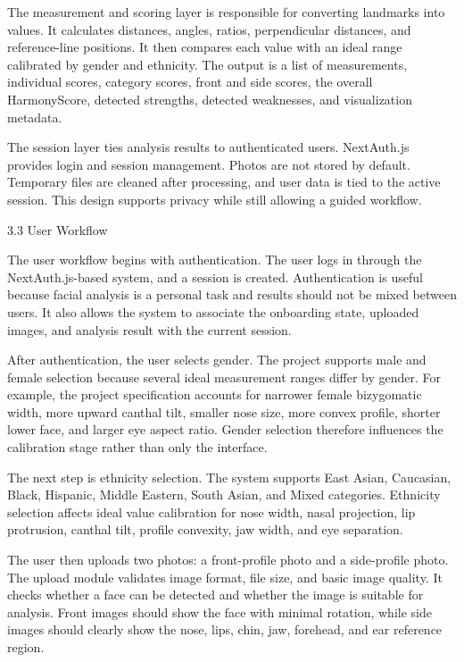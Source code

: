The measurement and scoring layer is responsible for converting landmarks into values. It calculates distances, angles, ratios, perpendicular distances, and reference-line positions. It then compares each value with an ideal range calibrated by gender and ethnicity. The output is a list of measurements, individual scores, category scores, front and side scores, the overall HarmonyScore, detected strengths, detected weaknesses, and visualization metadata.

The session layer ties analysis results to authenticated users. NextAuth.js provides login and session management. Photos are not stored by default. Temporary files are cleaned after processing, and user data is tied to the active session. This design supports privacy while still allowing a guided workflow.

3.3  User Workflow

The user workflow begins with authentication. The user logs in through the NextAuth.js-based system, and a session is created. Authentication is useful because facial analysis is a personal task and results should not be mixed between users. It also allows the system to associate the onboarding state, uploaded images, and analysis result with the current session.

After authentication, the user selects gender. The project supports male and female selection because several ideal measurement ranges differ by gender. For example, the project specification accounts for narrower female bizygomatic width, more upward canthal tilt, smaller nose size, more convex profile, shorter lower face, and larger eye aspect ratio. Gender selection therefore influences the calibration stage rather than only the interface.

The next step is ethnicity selection. The system supports East Asian, Caucasian, Black, Hispanic, Middle Eastern, South Asian, and Mixed categories. Ethnicity selection affects ideal value calibration for nose width, nasal projection, lip protrusion, canthal tilt, profile convexity, jaw width, and eye separation.

The user then uploads two photos: a front-profile photo and a side-profile photo. The upload module validates image format, file size, and basic image quality. It checks whether a face can be detected and whether the image is suitable for analysis. Front images should show the face with minimal rotation, while side images should clearly show the nose, lips, chin, jaw, forehead, and ear reference region.

